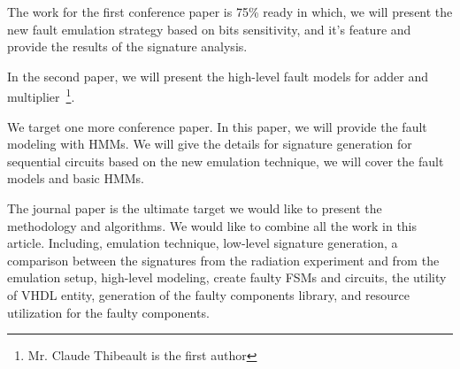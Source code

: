 The work for the first conference paper is 75\% ready in which, we will present the new fault emulation strategy based on bits sensitivity, and it's feature and provide the results of the signature analysis.

In the second paper, we will present the high-level fault models for adder and multiplier~\footnote{Mr. Claude Thibeault is the first author}. 

We target one more conference paper. In this paper, we will provide the fault modeling with HMMs. We will give the details for signature generation for sequential circuits based on the new emulation technique, we will cover the  fault models and basic HMMs.



The journal paper is the ultimate target we would like to present the methodology and algorithms.  We would like to combine all the work in this article. Including, emulation technique, low-level signature generation, a comparison between the signatures from the radiation experiment and from the emulation setup, high-level modeling, create faulty FSMs and circuits, the utility of  VHDL entity, generation of the faulty components library, and resource utilization for the faulty components.  


